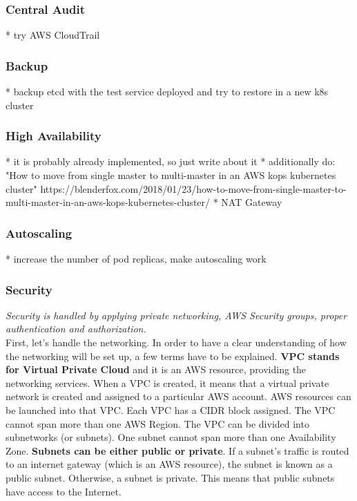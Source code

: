 \subsubsection{Central Audit}

* try AWS CloudTrail

\subsubsection{Backup}

* backup etcd with the test service deployed and try to restore in a new k8s cluster

\subsubsection{High Availability}

* it is probably already implemented, so just write about it
* additionally do: "How to move from single master to multi-master in an AWS kops kubernetes cluster" https://blenderfox.com/2018/01/23/how-to-move-from-single-master-to-multi-master-in-an-aws-kops-kubernetes-cluster/
* NAT Gateway

\subsubsection{Autoscaling}

* increase the number of pod replicas, make autoscaling work

\subsubsection{Security}
\textit{Security is handled by applying private networking, AWS Security groups, proper authentication and authorization.}
\\

First, let's handle the networking. In order to have a clear understanding of how the networking will be set up, a few terms have to be explained. \textbf{VPC stands for Virtual Private Cloud} and it is an AWS resource, providing the networking services. When a VPC is created, it means that a virtual private network is created and assigned to a particular AWS account. AWS resources can be launched into that VPC. Each VPC has a CIDR block assigned. The VPC cannot span more than one AWS Region. The VPC can be divided into subnetworks (or subnets). One subnet cannot span more than one Availability Zone. \textbf{Subnets can be either public or private}. If a subnet's traffic is routed to an internet gateway (which is an AWS resource), the subnet is known as a public subnet. Otherwise, a subnet is private\cite{aws-vpc}. This means that public subnets have access to the Internet.


